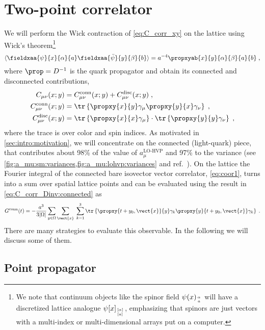 \section{Two-point correlator}
\label{sec:2pt-corr}

We will perform the Wick contraction of \cref{eq:C_corr_xy} on the lattice using Wick's theorem\footnote{We note that continuum objects like the spinor field $\psi(x)_{\alpha \atop a}$ will have a discretized lattice analogue $\psi[x]_{[\alpha] \atop [a]}$, emphasizing that spinors are just vectors with a multi-index or multi-dimensional arrays put on a computer.}
\begin{equation}
\langle \fieldxaa{\psi}{x}{\alpha}{a} \fieldxaa{\bar{\psi}}{y}{\beta}{b} \rangle =
a^{-4} \propxyab{x}{y}{\alpha}{\beta}{a}{b} \;,
\end{equation}
where $\prop = D^{-1}$ is the quark propagator and obtain its connected and disconnected contributions,
\begin{align}
C_{\mu \nu}(x;y) &= C_{\mu \nu}^{\text{conn}}(x;y) + C_{\mu \nu}^{\text{disc}}(x;y) \;, \\
C_{\mu \nu}^{\text{conn}}(x;y) &=
\tr \left\{
  \propxy{x}{y} \gamma_{\mu} \propxy{y}{x} \gamma_{\nu}
\right\} \;, \label{eq:C_corr_Dinv:connected} \\
C_{\mu \nu}^{\text{disc}}(x;y) &=
\tr \left\{ \propxy{x}{x} \gamma_{\mu} \right\}
\cdot
\tr \left\{ \propxy{y}{y} \gamma_{\nu} \right\} \;,
\end{align}
where the trace is over color and spin indices.
As motivated in \cref{sec:intro:motivation}, we will concentrate on the connected (light-quark) piece, that contributes about 98\% of the value of $a_{\mu}^{\text{LO-HVP}}$ and 97\% to the variance (see \cref{fig:a_mu:sm:variances,fig:a_mu:lohvp:variances} and ref.~\cite{snowmass:2025}).
On the lattice the Fourier integral of the connected bare isovector vector correlator, \cref{eq:coor1}, turns into a sum over spatial lattice points and can be evaluated using the result in \cref{eq:C_corr_Dinv:connected} as
\begin{equation} \label{eq:G:corr:connected}
G^{\text{conn}}(t) =
- \frac{a^{3}}{3 \lvert \Omega \rvert}
\sum_{y \in \Omega}
\sum_{\vect{x}} \;
\sum_{k=1}^{3}
\tr \left\{
  \propxy{t+y_0, \vect{x}}{y} \gamma_k \propxy{y}{t+y_0, \vect{x}} \gamma_k
\right\} \;.
\end{equation}
There are many strategies to evaluate this observable. In the following we will discuss some of them.

\subsection{Point propagator}
\label{sec:point:prop}

